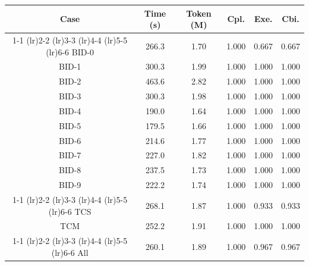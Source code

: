 \begin{tabular}{c|cc|ccc}
    \toprule[1pt]
    \textbf{Case} & \textbf{Time (s)} & \textbf{Token (M)} & \textbf{Cpl.} & \textbf{Exe.} & \textbf{Cbi.} \\
    \cmidrule(lr){1-1} \cmidrule(lr){2-2} \cmidrule(lr){3-3} \cmidrule(lr){4-4} \cmidrule(lr){5-5} \cmidrule(lr){6-6}
    BID-0 & 266.3 & 1.70 & 1.000 & 0.667 & 0.667 \\
    BID-1 & 300.3 & 1.99 & 1.000 & 1.000 & 1.000 \\
    BID-2 & 463.6 & 2.82 & 1.000 & 1.000 & 1.000 \\
    BID-3 & 300.3 & 1.98 & 1.000 & 1.000 & 1.000 \\
    BID-4 & 190.0 & 1.64 & 1.000 & 1.000 & 1.000 \\
    BID-5 & 179.5 & 1.66 & 1.000 & 1.000 & 1.000 \\
    BID-6 & 214.6 & 1.77 & 1.000 & 1.000 & 1.000 \\
    BID-7 & 227.0 & 1.82 & 1.000 & 1.000 & 1.000 \\
    BID-8 & 237.5 & 1.73 & 1.000 & 1.000 & 1.000 \\
    BID-9 & 222.2 & 1.74 & 1.000 & 1.000 & 1.000 \\
    \cmidrule(lr){1-1} \cmidrule(lr){2-2} \cmidrule(lr){3-3} \cmidrule(lr){4-4} \cmidrule(lr){5-5} \cmidrule(lr){6-6}
    TCS & 268.1 & 1.87 & 1.000 & 0.933 & 0.933 \\
    TCM & 252.2 & 1.91 & 1.000 & 1.000 & 1.000 \\
    \cmidrule(lr){1-1} \cmidrule(lr){2-2} \cmidrule(lr){3-3} \cmidrule(lr){4-4} \cmidrule(lr){5-5} \cmidrule(lr){6-6}
    All & 260.1 & 1.89 & 1.000 & 0.967 & 0.967 \\
    \bottomrule[1pt]
\end{tabular}
